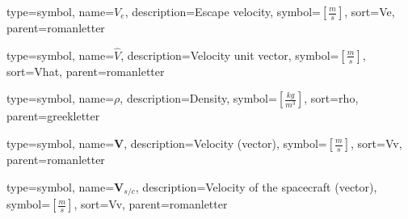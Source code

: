 {
type=symbol, %
name={\ensuremath{V_e}}, %
description={Escape velocity}, %
symbol={$\left[\frac{m}{s}\right]$}, %
sort=Ve, %
parent=romanletter %
}

{
	type=symbol, %
	name={\ensuremath{\hat{V}}}, %
	description={Velocity unit vector}, %
	symbol={$\left[\frac{m}{s}\right]$}, %
	sort=Vhat, %
	parent=romanletter %
}

{
type=symbol, %
name={\ensuremath{\rho}}, %
description={Density}, %
symbol={$\left[\frac{kg}{m^3}\right]$}, %
sort=rho, %
parent=greekletter %
}

{
type=symbol, %
name={\ensuremath{\mathbf{V}}}, %
description={Velocity (vector)}, %
symbol={$\left[\frac{m}{s}\right]$}, %
sort=Vv, %
parent=romanletter %
}

{
type=symbol, %
name={\ensuremath{ \mathbf{V}_{s/c} }}, %
description={Velocity of the spacecraft (vector)}, %
symbol={$\left[\frac{m}{s}\right]$}, %
sort=Vv, %
parent=romanletter %
}

